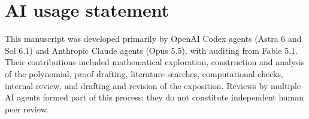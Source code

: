 \documentclass[11pt]{article}
\theoremstyle{definition}
\theoremstyle{remark}
\begin{document}

\clearpage
\section*{AI usage statement}
This manuscript was developed primarily by OpenAI Codex agents (Astra 6 and Sol 6.1)
and Anthropic Claude agents (Opus 5.5), with auditing from Fable 5.1.
Their contributions included mathematical
exploration, construction and analysis of the polynomial, proof drafting,
literature searches, computational checks, internal review, and drafting
and revision of the exposition. Reviews by multiple AI agents formed part
of this process; they do not constitute independent human peer review.
\end{document}
